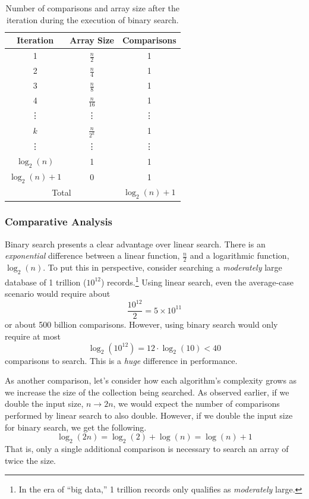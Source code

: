 {\renewcommand{\arraystretch}{1.5}
\begin{table}[h]
\centering
\begin{tabular}{c|c|c}
Iteration & Array Size & Comparisons \\
\hline\hline
1 & $\frac{n}{2}$ & 1 \\
2 & $\frac{n}{4}$ & 1 \\
3 & $\frac{n}{8}$ & 1 \\
4 & $\frac{n}{16}$ & 1 \\
\vdots & \vdots & \vdots \\
$k$ & $\frac{n}{2^k}$ & 1 \\
\vdots & \vdots & \vdots \\
$\log_2{(n)}$ & 1 & 1 \\
$\log_2{(n)}+1$ & 0 & 1 \\
\hline
\multicolumn{2}{c|}{Total} & $\log_2{(n)} + 1$ \\
\end{tabular}
\caption[Binary Search Comparison Total]{Number of comparisons and array size 
after the iteration during the execution of binary search.}
\label{table:binarySearchComparisons}
\end{table}
}

\subsubsection{Comparative Analysis}

Binary search presents a clear advantage over linear search.  There is
an \emph{exponential} difference between a linear function, $\frac{n}{2}$
and a logarithmic function, $\log_2{(n)}$.  To put this in
perspective, consider searching a \emph{moderately} large database of 1
trillion ($10^{12}$) records.\footnote{In the era of ``big data,'' 1 trillion
records only qualifies as \emph{moderately} large.}  Using linear search, 
even the average-case scenario would require about
  $$\frac{10^{12}}{2} = 5 \times 10^{11}$$
or about 500 billion comparisons.  However, using binary search would only
require at most 
  $$\log_2{(10^{12})} = 12 \cdot \log_2{(10)} < 40$$ 
comparisons to search.  This is a \emph{huge} difference in performance.

As another comparison, let's consider how each algorithm's complexity
grows as we increase the size of the collection being searched.  As observed
earlier, if we double the input size, $n \rightarrow 2n$, we would expect
the number of comparisons performed by linear search to also double.
However, if we double the input size for binary search, we get the following.
  $$\log_2{(2n)} = \log_2{(2)} + \log{(n)} = \log{(n)} + 1$$
That is, only a single additional comparison is necessary to search an array
of twice the size.

